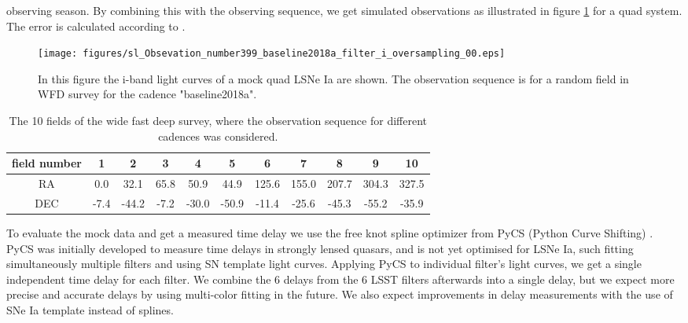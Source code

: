 observing season.
By combining this with the observing sequence, we get simulated
observations as illustrated in figure \ref{fig: simulated observation}
for a quad system. The error is calculated according to \cite[sec 3.5,
p. 67]{2009:LSSTscience}.
\begin{figure}[h!]
\centering
\texttt{[image: figures/sl\_Obsevation\_number399\_baseline2018a\_filter\_i\_oversampling\_00.eps]}
\caption[]{In this figure the i-band light curves of a mock quad LSNe Ia are shown. The observation sequence is for a random field in WFD survey for the cadence "baseline2018a".}
\label{fig: simulated observation}
\end{figure}
%
\begin{table}
\centering
\begin{tabular}{c|c|c|c|c|c|c|c|c|c|c}
field number & 1 & 2 & 3 & 4 & 5& 6 & 7 & 8 & 9 & 10  \\
\hline
RA& 0.0 & 32.1 & 65.8 & 50.9 &44.9& 125.6 & 155.0 & 207.7 & 304.3 & 327.5  \\
\hline
DEC& -7.4 & -44.2 & -7.2 & -30.0 & -50.9& -11.4 & -25.6 & -45.3 & -55.2 & -35.9  \\
\end{tabular}
\caption{The 10 fields of the wide fast deep survey, where the observation sequence for different cadences was considered.}
\label{tab: 10 wfd fields}
\end{table}
%

To evaluate the mock data and get a measured time delay we use the
free knot spline optimizer from PyCS (Python Curve Shifting)
\citep{2013:Tewesb,Bonvin:2015jia}. PyCS was initially developed to
measure time delays in strongly lensed quasars, and is not yet
optimised for LSNe Ia, such fitting simultaneously multiple filters
and using SN template light curves.  Applying PyCS to individual
filter's light curves, we get a single independent time delay for each
filter.  We combine the 6 delays from the 6 LSST filters afterwards
into a single delay, but we expect more precise and accurate delays by
using multi-color fitting in the future. We also expect improvements
in delay measurements with the use of SNe Ia template instead of
splines.  


